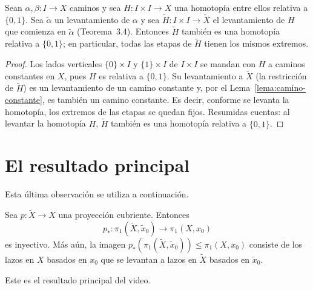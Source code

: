 \documentclass[11pt]{article}
\begin{document}
\begin{lema}\label{lema:levantamiento-rel}
Sean $\alpha,\beta\colon I\to X$ caminos y sea $H\colon I\times I\to X$ una homotopía entre ellos relativa a $\{0,1\}$. Sea $\tilde\alpha$ un levantamiento de $\alpha$ y sea $\tilde H\colon I\times I\to\tilde X$ el levantamiento de $H$ que comienza en $\tilde\alpha$ (Teorema~3.4). Entonces $\tilde H$ también es una homotopía relativa a $\{0,1\}$; en particular, todas las etapas de $\tilde H$ tienen los mismos extremos.
\end{lema}

\begin{proof}
Los lados verticales $\{0\}\times I$ y $\{1\}\times I$ de $I\times I$ se mandan con $H$ a caminos constantes en $X$, pues $H$ es relativa a $\{0,1\}$. Su levantamiento a $\tilde X$ (la restricción de $\tilde H$) es un levantamiento de un camino constante y, por el Lema~\ref{lema:camino-constante}, es también un camino constante. Es decir, conforme se levanta la homotopía, los extremos de las etapas se quedan fijos. Resumidas cuentas: al levantar la homotopía $H$, $\tilde H$ también es una homotopía relativa a $\{0,1\}$.
\end{proof}

\section*{El resultado principal}

Esta última observación se utiliza a continuación.

\begin{prop}\label{prop:inyectivo}
Sea $p\colon\tilde X\to X$ una proyección cubriente. Entonces
\[
  p_*\colon\pi_1(\tilde X,\tilde x_0)\to\pi_1(X,x_0)
\]
es inyectivo. Más aún, la imagen $p_*(\pi_1(\tilde X,\tilde x_0))\le\pi_1(X,x_0)$ consiste de los lazos en $X$ basados en $x_0$ que se levantan a lazos en $\tilde X$ basados en $\tilde x_0$.
\end{prop}

Este es el resultado principal del video.
\end{document}
